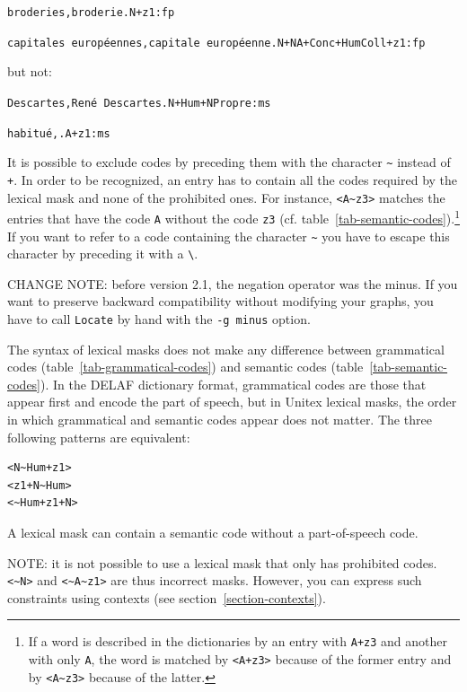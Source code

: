 \bigskip
\noindent
\texttt{broderies,broderie.N+z1:fp}

\noindent
\texttt{capitales europ\'eennes,capitale europ\'eenne.N+NA+Conc+HumColl+z1:fp}

\bigskip
\noindent but not:

\bigskip
\noindent
\texttt{Descartes,Ren\'e Descartes.N+Hum+NPropre:ms}

\noindent
\texttt{habitu\'e,.A+z1:ms}

\bigskip
\noindent It is possible to exclude codes by preceding them with the character \verb+~+
instead of \verb$+$.
In order to be recognized, an entry has to contain all the
codes required by the lexical mask and none of the prohibited ones. For instance,
\verb+<A~z3>+ matches the entries that have the code \verb+A+ without the code
\verb+z3+ (cf. table~\ref{tab-semantic-codes}).\footnote{If a word is described in the
dictionaries by an entry with \texttt{A+z3} and another with only \texttt{A}, the word
is matched by \texttt{<A+z3>} because of the former entry and by
\texttt{<A{\textasciitilde}z3>} because of the latter.}
If you want to refer to a code containing the character \verb$~$ you have to
escape this character by preceding it with a \verb+\+. 

\bigskip
\noindent CHANGE NOTE: before version 2.1, the negation operator was the minus. If you want
                       to preserve backward compatibility without modifying your graphs, you have
                       to call \verb+Locate+ by hand with the \verb+-g minus+ option.
\index{\verbt{\textasciitilde~}}

\bigskip
\noindent The syntax of lexical masks does not make any difference between grammatical codes
(table~\ref{tab-grammatical-codes}) and semantic codes (table~\ref{tab-semantic-codes}).
In the DELAF dictionary format, grammatical codes are those that appear first and
encode the part of speech, but in Unitex lexical masks,
the order in which grammatical and semantic codes appear does not matter. The
three following patterns are equivalent:

\begin{verbatim}
<N~Hum+z1>
<z1+N~Hum>
<~Hum+z1+N>
\end{verbatim}

\noindent A lexical mask can contain a semantic code without a part-of-speech code.

\bigskip
\noindent NOTE: it is not possible to use a lexical mask that only has
prohibited codes. \verb+<~N>+ and \verb+<~A~z1>+ are thus incorrect masks. 
However, you can express
such constraints using contexts (see section~\ref{section-contexts}).


